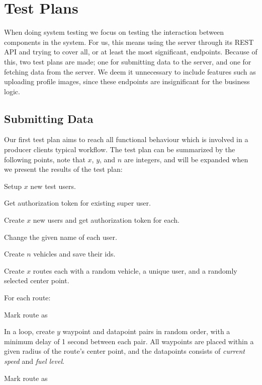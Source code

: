 \section{Test Plans}
When doing system testing we focus on testing the interaction between components in the system.
For us, this means using the server through its REST API and trying to cover all, or at least the most significant, endpoints.
Because of this, two test plans are made; one for submitting data to the server, and one for fetching data from the server.
We deem it unnecessary to include features such as uploading profile images, since these endpoints are insignificant for the business logic.

\subsection{Submitting Data}
Our first test plan aims to reach all functional behaviour which is involved in a producer clients typical workflow.
The test plan can be summarized by the following points, note that $x$, $y$, and $n$ are integers, and will be expanded when we present the results of the test plan:
\begin{enumberate}
    \item Setup $x$ new test users.
    \begin{enumberate}
        \item Get authorization token for existing super user.
        \item Create $x$ new users and get authorization token for each.
        \item Change the given name of each user.
    \end{enumberate}
    \item Create $n$ vehicles and save their ids.
    \item Create $x$ routes each with a random vehicle, a unique user, and a randomly selected center point.
    \item For each route:
    \begin{enumberate}
        \item Mark route as 
        \item In a loop, create $y$ waypoint and datapoint pairs in random order, with a minimum delay of 1 second between each pair.
              All waypoints are placed within a given radius of the route's center point, and the datapoints consists of \textit{current speed} and \textit{fuel level}.
        \item Mark route as 
    \end{enumberate}
\end{enumberate}

